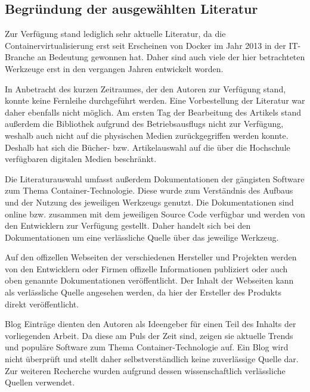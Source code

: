 \subsection{Begründung der ausgewählten Literatur}
\label{app:BegruendungLiteratur}
Zur Verfügung stand lediglich sehr aktuelle Literatur, da die Containervirtualisierung erst seit Erscheinen von Docker im Jahr 2013 in der IT-Branche an Bedeutung gewonnen hat. Daher sind auch viele der hier betrachteten Werkzeuge erst in den vergangen Jahren entwickelt worden.

In  Anbetracht des kurzen Zeitraumes, der den Autoren zur Verfügung stand, konnte keine Fernleihe durchgeführt werden.
Eine Vorbestellung der Literatur war daher ebenfalls nicht möglich.
Am ersten Tag der Bearbeitung des Artikels stand außerdem die Bibliothek aufgrund des Betriebsausflugs nicht zur Verfügung, weshalb auch nicht auf die physischen Medien zurückgegriffen werden konnte.
Deshalb hat sich die Bücher- bzw. Artikelauswahl auf die über die Hochschule verfügbaren digitalen Medien beschränkt.

Die  Literaturauswahl umfasst außerdem Dokumentationen der gängisten Software zum Thema Container-Technologie.
Diese wurde zum Verständnis des Aufbaus und der Nutzung des jeweiligen Werkzeugs genutzt. 
Die Dokumentationen sind online bzw. zusammen mit dem jeweiligen Source Code verfügbar und werden von den Entwicklern zur  Verfügung gestellt. 
Daher handelt sich bei den Dokumentationen um eine verlässliche Quelle über das jeweilige Werkzeug.


Auf den offizellen Webseiten der verschiedenen Hersteller und Projekten werden von den Entwicklern oder Firmen offizelle Informationen publiziert oder auch oben genannte Dokumentationen veröffentlicht. Der Inhalt der Webseiten kann als verlässliche Quelle angesehen werden, da hier der Ersteller des Produkts direkt veröffentlicht.


Blog Einträge dienten den Autoren als Ideengeber für einen Teil des Inhalts der vorliegenden Arbeit.
Da diese am Puls der Zeit sind, zeigen sie aktuelle Trends und populäre Software zum Thema Container-Technologie auf.
Ein Blog wird nicht überprüft und stellt daher selbstverständlich keine zuverlässige Quelle dar.
Zur weiteren Recherche wurden aufgrund dessen wissenschaftlich verlässliche Quellen verwendet.